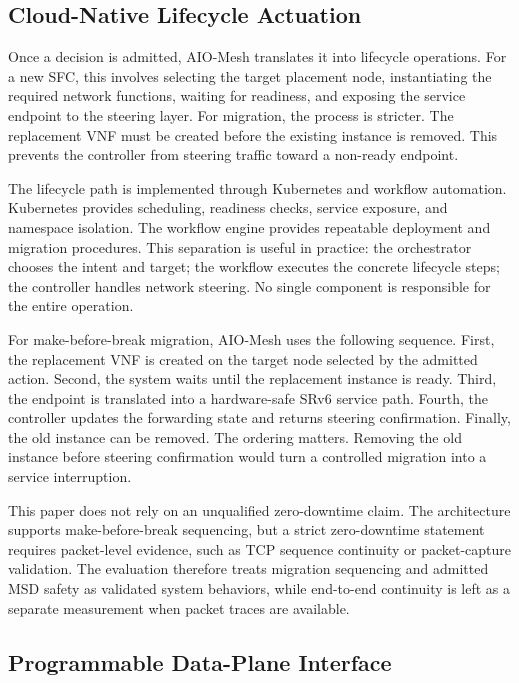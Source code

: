 \documentclass[final,5p]{elsarticle}
\begin{document}
\subsection{Cloud-Native Lifecycle Actuation}
\label{subsec:cloud_native_actuation}

Once a decision is admitted, AIO-Mesh translates it into lifecycle operations. For a new SFC, this involves selecting the target placement node, instantiating the required network functions, waiting for readiness, and exposing the service endpoint to the steering layer. For migration, the process is stricter. The replacement VNF must be created before the existing instance is removed. This prevents the controller from steering traffic toward a non-ready endpoint.

The lifecycle path is implemented through Kubernetes and workflow automation. Kubernetes provides scheduling, readiness checks, service exposure, and namespace isolation. The workflow engine provides repeatable deployment and migration procedures. This separation is useful in practice: the orchestrator chooses the intent and target; the workflow executes the concrete lifecycle steps; the controller handles network steering. No single component is responsible for the entire operation.

For make-before-break migration, AIO-Mesh uses the following sequence. First, the replacement VNF is created on the target node selected by the admitted action. Second, the system waits until the replacement instance is ready. Third, the endpoint is translated into a hardware-safe SRv6 service path. Fourth, the controller updates the forwarding state and returns steering confirmation. Finally, the old instance can be removed. The ordering matters. Removing the old instance before steering confirmation would turn a controlled migration into a service interruption.

This paper does not rely on an unqualified zero-downtime claim. The architecture supports make-before-break sequencing, but a strict zero-downtime statement requires packet-level evidence, such as TCP sequence continuity or packet-capture validation. The evaluation therefore treats migration sequencing and admitted MSD safety as validated system behaviors, while end-to-end continuity is left as a separate measurement when packet traces are available.

\subsection{Programmable Data-Plane Interface}
\label{subsec:data_plane_interface}
\end{document}
